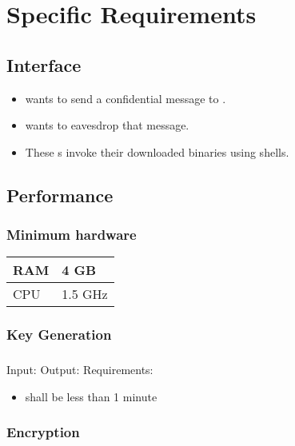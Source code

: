 \section{Specific Requirements}


\subsection{Interface}

\begin{frame}
\begin{itemize}
\item \alice{} wants to send a confidential message to \bob.
\item \eve{} wants to eavesdrop that message.
\item These \eu s invoke their downloaded \cry{} binaries
  using \cl{} shells.
\end{itemize}
\end{frame}


\subsection{Performance}

\begin{frame}
\frametitle{Minimum hardware}
\begin{tabular}{l|l}
RAM & 4 GB \\ \hline
CPU & 1.5 GHz
\end{tabular}
\end{frame}

\subsubsection{Key Generation}

\begin{frame}
\frametitle{\bob}
Input: \generatekeysin \medskip
Output: \generatekeysout \medskip
Requirements:
\begin{itemize}
\item \generatekeystime{}
  shall be less than 1 minute
\end{itemize}
\end{frame}

\subsubsection{Encryption}

